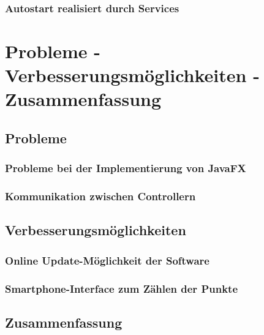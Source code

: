 \subsubsection{Autostart realisiert durch Services}

\section{Probleme - Verbesserungsmöglichkeiten - Zusammenfassung}
\subsection{Probleme}
\subsubsection{Probleme bei der Implementierung von JavaFX}
\subsubsection{Kommunikation zwischen Controllern}
\subsubsection{}
\subsection{Verbesserungsmöglichkeiten}
\subsubsection{Online Update-Möglichkeit der Software}
\subsubsection{Smartphone-Interface zum Zählen der Punkte}
\subsection{Zusammenfassung}